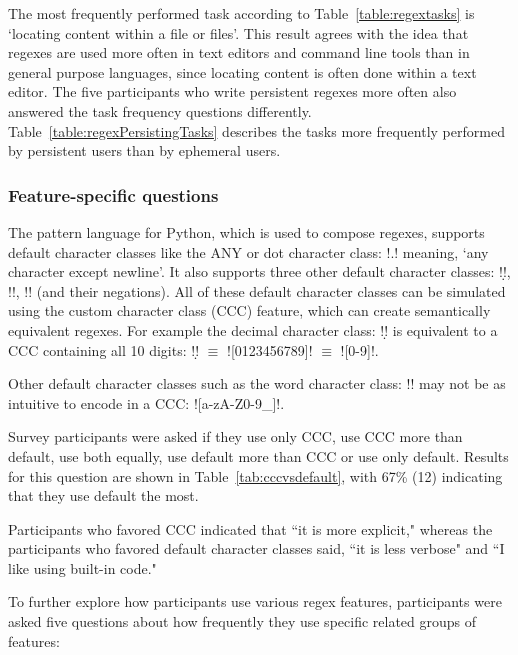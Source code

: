 The most frequently performed task according to Table~\ref{table:regextasks} is `locating content within a file or files'.  This result agrees with the idea that regexes are used more often in text editors and command line tools than in general purpose languages, since locating content is often done within a text editor.  The five participants who write persistent regexes more often also answered the task frequency questions differently.  Table~\ref{table:regexPersistingTasks} describes the tasks more frequently performed by persistent users than by ephemeral users.





\subsubsection{Feature-specific questions}
The pattern language for Python, which is used to compose regexes, supports default character classes like the ANY or dot character class: \cverb!.! meaning, `any character except newline'.
It also supports three other default character classes: \cverb!\d!, \cverb!\w!, \cverb!\s! (and their negations). All of these default character classes can be simulated using the custom character class (CCC) feature, which can create semantically equivalent regexes.
For example  the decimal character class: \cverb!\d! is equivalent to a CCC containing all 10 digits:  \cverb!\d! $\equiv$ \cverb![0123456789]! $\equiv$ \cverb![0-9]!.

Other default character classes such as the word character class: \cverb!\w! may not be as intuitive to encode in a CCC: \cverb![a-zA-Z0-9_]!.

Survey participants were asked if they use only CCC, use CCC more than default, use both equally, use default more than CCC or use only default.  Results for this question are shown in Table~\ref{tab:cccvsdefault}, with 67\% (12) indicating that they use default the most.

Participants who favored CCC indicated that ``it is more explicit," whereas the participants who favored default character classes said,  ``it is less verbose" and ``I like using built-in code."

To further explore how participants use various regex features, participants were asked five questions about how frequently they use specific related groups of features:

